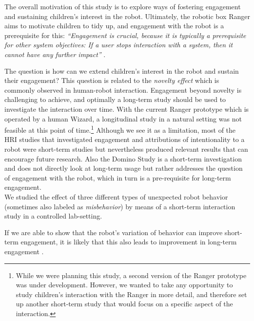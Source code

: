 \documentclass{sig-alternate}
\begin{document}
The overall motivation of this study is to explore ways of fostering engagement and sustaining children's interest in the robot. Ultimately, the robotic box Ranger aims to motivate children to tidy up, and engagement with the robot is a prerequisite for this: \textit{``Engagement is crucial, because it is typically a prerequisite for other system objectives: If a user stops interaction with a system, then it cannot have any further impact''} \cite[p.~648]{bickmore_maintaining_2010}.

The question is how can we extend children's interest in the robot and sustain their engagement? This question is related to the \textit{novelty effect} which is commonly observed in human-robot interaction. Engagement beyond novelty is challenging to achieve, and optimally a long-term study should be used to investigate the interaction over time. With the current Ranger prototype which is operated by a human Wizard, a longitudinal study in a natural setting was not feasible at this point of time.\footnote{While we were planning this study, a second version of the Ranger prototype was under development. However, we wanted to take any opportunity to study children's interaction with the Ranger in more detail, and therefore set up another short-term study that would focus on a specific aspect of the interaction.} Although we see it as a limitation, most of the HRI studies that investigated engagement and attributions of intentionality to a robot were short-term studies but nevertheless produced relevant results that can encourage future research. Also the Domino Study is a short-term investigation and does not directly look at long-term usage but rather addresses the question of engagement with the robot, which in turn is a pre-requisite for long-term engagement.\\

We studied the effect of three different types of unexpected robot behavior (sometimes also labeled as \textit{misbehavior}) by means of a short-term interaction study in a controlled lab-setting.

If we are able to show that the robot's variation of behavior can improve short-term engagement, it is likely that this also leads to improvement in long-term engagement \cite{bickmore_maintaining_2010}.
\end{document}
